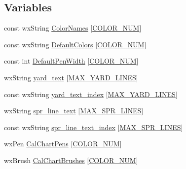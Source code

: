 \subsection*{Variables}
\begin{DoxyCompactItemize}
\item 
const wx\-String \hyperlink{a00190_a7acbbf3434fafe32a73716825cf271aa}{Color\-Names} \mbox{[}\hyperlink{a00191_a09f513be9cbd80355eda10ee8e4059e2a1ad5b60f3b4357df62b270dc435e151d}{C\-O\-L\-O\-R\-\_\-\-N\-U\-M}\mbox{]}
\item 
const wx\-String \hyperlink{a00190_a3076b2817e7f19e5cc9e208cb9d4d800}{Default\-Colors} \mbox{[}\hyperlink{a00191_a09f513be9cbd80355eda10ee8e4059e2a1ad5b60f3b4357df62b270dc435e151d}{C\-O\-L\-O\-R\-\_\-\-N\-U\-M}\mbox{]}
\item 
const int \hyperlink{a00190_a88920aef299a66dd1f54a17d60872bb0}{Default\-Pen\-Width} \mbox{[}\hyperlink{a00191_a09f513be9cbd80355eda10ee8e4059e2a1ad5b60f3b4357df62b270dc435e151d}{C\-O\-L\-O\-R\-\_\-\-N\-U\-M}\mbox{]}
\item 
wx\-String \hyperlink{a00190_af2536937ab0e61abae2a6eac588bd630}{yard\-\_\-text} \mbox{[}\hyperlink{a00191_ad80cbf96e4b808112d8433ff73da45a8}{M\-A\-X\-\_\-\-Y\-A\-R\-D\-\_\-\-L\-I\-N\-E\-S}\mbox{]}
\item 
const wx\-String \hyperlink{a00190_a8c16498e1a7dfff8f07c031d6795f940}{yard\-\_\-text\-\_\-index} \mbox{[}\hyperlink{a00191_ad80cbf96e4b808112d8433ff73da45a8}{M\-A\-X\-\_\-\-Y\-A\-R\-D\-\_\-\-L\-I\-N\-E\-S}\mbox{]}
\item 
wx\-String \hyperlink{a00190_a3ea2bd5fe720a1c305963493018ef961}{spr\-\_\-line\-\_\-text} \mbox{[}\hyperlink{a00191_af967bcf8c2a02116db262bf1e1777a1a}{M\-A\-X\-\_\-\-S\-P\-R\-\_\-\-L\-I\-N\-E\-S}\mbox{]}
\item 
const wx\-String \hyperlink{a00190_a7a6ae3e09522a20c3bb37d6b8eacb202}{spr\-\_\-line\-\_\-text\-\_\-index} \mbox{[}\hyperlink{a00191_af967bcf8c2a02116db262bf1e1777a1a}{M\-A\-X\-\_\-\-S\-P\-R\-\_\-\-L\-I\-N\-E\-S}\mbox{]}
\item 
wx\-Pen \hyperlink{a00190_a798b4f2bd8507b50bef257293dd6acfa}{Cal\-Chart\-Pens} \mbox{[}\hyperlink{a00191_a09f513be9cbd80355eda10ee8e4059e2a1ad5b60f3b4357df62b270dc435e151d}{C\-O\-L\-O\-R\-\_\-\-N\-U\-M}\mbox{]}
\item 
wx\-Brush \hyperlink{a00190_a6c3629e19bf641b92239c2f6d3b1dc47}{Cal\-Chart\-Brushes} \mbox{[}\hyperlink{a00191_a09f513be9cbd80355eda10ee8e4059e2a1ad5b60f3b4357df62b270dc435e151d}{C\-O\-L\-O\-R\-\_\-\-N\-U\-M}\mbox{]}
\item 

\end{DoxyCompactItemize}
